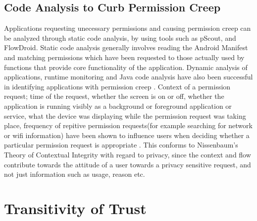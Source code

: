 \subsection{Code Analysis to Curb Permission Creep}
Applications requesting unecessary permissions and causing permission creep can be analyzed through static code analysis, by using tools such as pScout\cite{au2012pscout}, and FlowDroid\cite{arzt2014flowdroid}. Static code analysis generally involves reading the Android Manifest and matching permissions which have been requested to those actually used by functions that provide core functionality of the application. Dynamic analysis of applications, runtime monitoring and Java code analysis have also been successful in identifying applications with permission creep \cite{spreitzenbarth2013mobile}. Context of a permission request; time of the request, whether the screen is on or off, whether the application is running visibly as a background or foreground application or service, what the device was displaying while the permission request was taking place, frequency of repitive permission requests(for example searching for network or wifi information) have been shown to influence users when deciding whether a particular permission request is appropriate \cite{wijesekera2015android}. This conforms to Nissenbaum's Theory of Contextual Integrity\cite{nissenbaum2004privacy} with regard to privacy, since the context and flow contribute towards the attitude of a user towards a privacy sensitive request, and not just information such as usage, reason etc.

\section{Transitivity of Trust}
